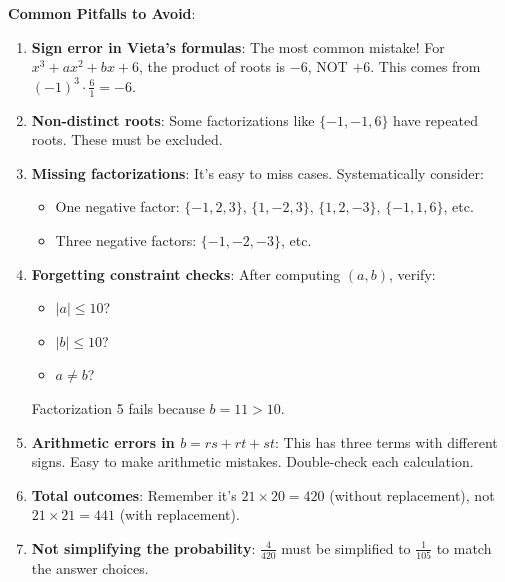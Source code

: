 \documentclass[12pt]{article}
\begin{document}
\begin{warningbox}
\textbf{Common Pitfalls to Avoid}:

\begin{enumerate}
    \item \textbf{Sign error in Vieta's formulas}: The most common mistake! For $x^3 + ax^2 + bx + 6$, the product of roots is $-6$, NOT $+6$. This comes from $(-1)^3 \cdot \frac{6}{1} = -6$.
    
    \item \textbf{Non-distinct roots}: Some factorizations like $\{-1, -1, 6\}$ have repeated roots. These must be excluded.
    
    \item \textbf{Missing factorizations}: It's easy to miss cases. Systematically consider:
    \begin{itemize}
        \item One negative factor: $\{-1, 2, 3\}$, $\{1, -2, 3\}$, $\{1, 2, -3\}$, $\{-1, 1, 6\}$, etc.
        \item Three negative factors: $\{-1, -2, -3\}$, etc.
    \end{itemize}
    
    \item \textbf{Forgetting constraint checks}: After computing $(a, b)$, verify:
    \begin{itemize}
        \item $|a| \leq 10$?
        \item $|b| \leq 10$?
        \item $a \neq b$?
    \end{itemize}
    Factorization 5 fails because $b = 11 > 10$.
    
    \item \textbf{Arithmetic errors in $b = rs + rt + st$}: This has three terms with different signs. Easy to make arithmetic mistakes. Double-check each calculation.
    
    \item \textbf{Total outcomes}: Remember it's $21 \times 20 = 420$ (without replacement), not $21 \times 21 = 441$ (with replacement).
    
    \item \textbf{Not simplifying the probability}: $\frac{4}{420}$ must be simplified to $\frac{1}{105}$ to match the answer choices.
\end{enumerate}
\end{warningbox}
\end{document}
